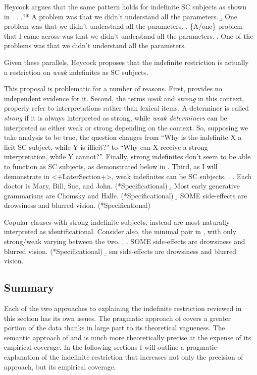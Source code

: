 \documentclass[GPFinal]{subfiles}
\begin{document}
Heycock argues that the same pattern holds for indefinite SC subjects as shown in \Next.
\ex.
\a.?* A problem was that we didn't understand all the parameters.
\b. One problem was that we didn't understand all the parameters.
\b. \{A/one\} problem that I came across was that we didn't understand all the parameters.
\b. One of the problems was that we didn't understand all the parameters.\hfill\parencite{heycock2012specification}

Given these parallels, Heycock proposes that the indefinite restriction is actually a restriction on \textit{weak} indefinites as SC subjects.

This proposal is problematic for a number of reasons.
First, \textcite{heycock2012specification} provides no independent evidence for it.
Second, the terms \textit{weak} and \textit{strong} in this context, properly refer to interpretations rather than lexical items.
A determiner is called \textit{strong} if it is always interpreted as strong, while \textit{weak determiners} can be interpreted as either weak or strong depending on the context.
So, supposing we take  analysis to be true, the question changes from ``Why is the indefinite X a licit SC subject, while Y is illicit?'' to ``Why can X receive a strong interpretation, while Y cannot?''.
Finally, strong indefinites don't seem to be able to function as SC subjects, as demonstrated below in \Next.
Third, as I will demonstrate in <+LaterSection+>, weak indefinites can be SC subjects.
\ex.
\a. Each doctor is Mary, Bill, Sue, and John. (*Specificational)
\b. Most early generative grammarians are Chomsky and Halle. (*Specificational)
\b. SOME side-effects are drowsiness and blurred vision. (*Specificational)

Copular clauses with strong indefinite subjects, instead are most naturally interpreted as identificational.
Consider also, the minimal pair in \Next, with only strong/weak varying between the two.
\ex.
\a. SOME side-effects are drowsiness and blurred vision. (*Specificational)
\b. sm side-effects are drowsiness and blurred vision.


\subsection{Summary}
Each of the two approaches to explaining the indefinite restriction reviewed in this section has its own issues.
The pragmatic approach of \textcite{mikkelsen2004specifying} covers a greater portion of the data thanks in large part to its theoretical vagueness.
The semantic approach of \textcite{heycockkroch1999pseudocleft} and \textcite{heycock2012specification} is much more theoretically precise at the expense of its empirical coverage.
In the following sections I will outline a pragmatic explanation of the indefinite restriction that increases not only the precision of  approach, but its empirical coverage.
\end{document}
